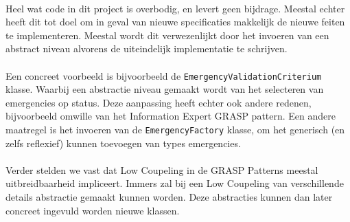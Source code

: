 \paragraph{}
Heel wat code in dit project is overbodig, en levert geen bijdrage. Meestal echter heeft dit tot doel om in geval van nieuwe specificaties makkelijk de nieuwe feiten te implementeren. Meestal wordt dit verwezenlijkt door het invoeren van een abstract niveau alvorens de uiteindelijk implementatie te schrijven.
\paragraph{}
Een concreet voorbeeld is bijvoorbeeld de \verb+EmergencyValidationCriterium+ klasse. Waarbij een abstractie niveau gemaakt wordt van het selecteren van emergencies op status. Deze aanpassing heeft echter ook andere redenen, bijvoorbeeld omwille van het Information Expert GRASP pattern. Een andere maatregel is het invoeren van de \verb+EmergencyFactory+ klasse, om het generisch (en zelfs reflexief) kunnen toevoegen van types emergencies.
\paragraph{}
Verder stelden we vast dat Low Coupeling in de GRASP Patterns meestal uitbreidbaarheid impliceert. Immers zal bij een Low Coupeling van verschillende details abstractie gemaakt kunnen worden. Deze abstracties kunnen dan later concreet ingevuld worden nieuwe klassen.